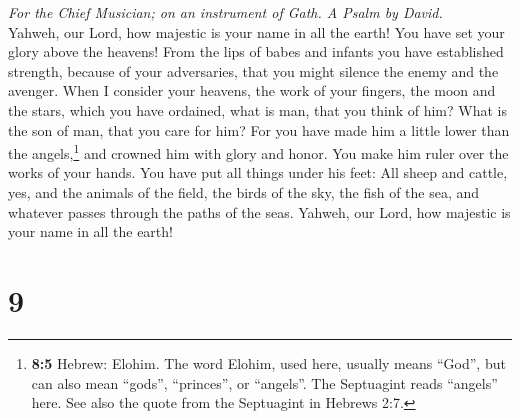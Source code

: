 \emph{For the Chief Musician; on an instrument of Gath. A Psalm by
David.}\\
 Yahweh, our Lord, how majestic is your name in all the
earth! You have set your glory above the heavens!  From
the lips of babes and infants you have established strength, because of
your adversaries, that you might silence the enemy and the avenger.
 When I consider your heavens, the work of your fingers,
the moon and the stars, which you have ordained,  what is
man, that you think of him? What is the son of man, that you care for
him?  For you have made him a little lower than the
angels,\footnote{\textbf{8:5} Hebrew: Elohim. The word Elohim, used
  here, usually means ``God'', but can also mean ``gods'', ``princes'',
  or ``angels''. The Septuagint reads ``angels'' here. See also the
  quote from the Septuagint in Hebrews 2:7.} and crowned him with glory
and honor.  You make him ruler over the works of your
hands. You have put all things under his feet:  All sheep
and cattle, yes, and the animals of the field,  the birds
of the sky, the fish of the sea, and whatever passes through the paths
of the seas.  Yahweh, our Lord, how majestic is your name
in all the earth!

\hypertarget{section-8}{%
\section{9}\label{section-8}}

